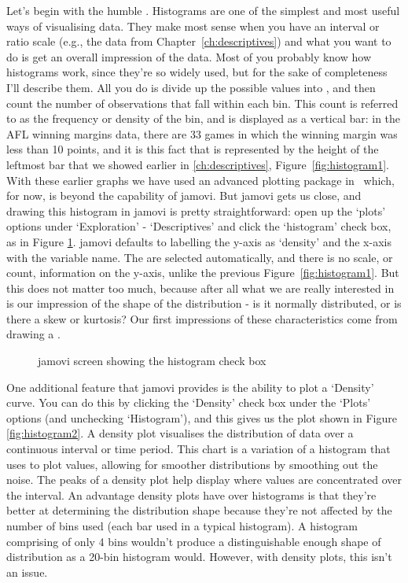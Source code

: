 Let's begin with the humble . Histograms are one of the simplest and most useful ways of visualising data. They make most sense when you have an interval or ratio scale (e.g., the  data from Chapter~\ref{ch:descriptives}) and what you want to do is get an overall impression of the data. Most of you probably know how histograms work, since they're so widely used, but for the sake of completeness I'll describe them. All you do is divide up the possible values into , and then count the number of observations that fall within each bin. This count is referred to as the frequency or density of the bin, and is displayed as a vertical bar: in the AFL winning margins data, there are 33 games in which the winning margin was less than 10 points, and it is this fact that is represented by the height of the leftmost bar that we showed earlier in \ref{ch:descriptives}, Figure~\ref{fig:histogram1}. With these earlier graphs we have used an advanced plotting package in \R\ which, for now, is beyond the capability of jamovi. But jamovi gets us close, and drawing this histogram in jamovi is pretty straightforward: open up the `plots' options under `Exploration' - `Descriptives' and click the `histogram' check box, as in Figure \ref{fig:jamovi_histogram}. jamovi defaults to labelling the y-axis as `density' and the x-axis with the variable name. The  are selected automatically, and there is no scale, or count, information on the y-axis, unlike the previous Figure~\ref{fig:histogram1}. But this does not matter too much, because after all what we are really interested in is our impression of the shape of the distribution - is it normally distributed, or is there a skew or kurtosis? Our first impressions of these characteristics come from drawing a .

\begin{figure}[ht]
\begin{center}
\caption{jamovi screen showing the histogram check box}
\label{fig:jamovi_histogram}
\HR
\end{center}
\end{figure}

One additional feature that jamovi provides is the ability to plot a `Density' curve. You can do this by clicking the `Density' check box under the `Plots' options (and unchecking `Histogram'), and this gives us the plot shown in Figure \ref{fig:histogram2}. A density plot visualises the distribution of data over a continuous interval or time period. This chart is a variation of a histogram that uses  to plot values, allowing for smoother distributions by smoothing out the noise. The peaks of a density plot help display where values are concentrated over the interval. An advantage density plots have over histograms is that they're better at determining the distribution shape because they're not affected by the number of bins used (each bar used in a typical histogram). A histogram comprising of only 4 bins wouldn't produce a distinguishable enough shape of distribution as a 20-bin histogram would. However, with density plots, this isn't an issue. 

